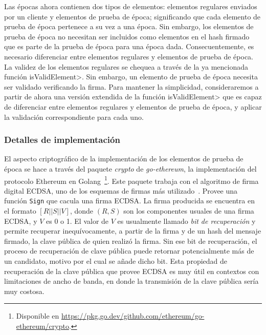 Las épocas ahora contienen dos tipos de elementos: elementos regulares enviados por
un cliente y elementos de prueba de época; significando que cada elemento de prueba de época
pertenece a su vez a una época. Sin embargo, los elementos de prueba de época no necesitan ser
incluidos como elementos en el hash firmado que es parte de la prueba de época para una época
dada.
%
Consecuentemente, es necesario diferenciar entre elementos regulares y elementos de prueba de época.
%
La validez de los elementos regulares se chequea a través de la ya mencionada función
\<isValidElement>.
%
Sin embargo, un elemento de prueba de época necesita ser validado verificando la firma.
%
Para mantener la simplicidad, consideraremos a partir de ahora una versión extendida de la función
\<isValidElement> que es capaz de diferenciar entre elementos regulares y elementos de prueba de época,
y aplicar la validación correspondiente para cada uno.

\subsubsection{Detalles de implementación}

El aspecto criptográfico de la implementación de los elementos de prueba de época se
hace a través del paquete \textit{crypto} de \textit{go-ethereum}, la implementación
del protocolo Ethereum en Golang~\footnote{Disponible en \url{https://pkg.go.dev/github.com/ethereum/go-ethereum/crypto}.}.
%
Este paquete trabaja con el algoritmo de firma digital ECDSA, uno de los esquemas de firmas más
utilizado~\cite{real.world.crypto}.
%
Provee una función \texttt{Sign} que cacula una firma ECDSA.
%
La firma producida se encuentra en el formato $[R || S || V]$, donde $(R, S)$ son los componentes usuales
de una firma ECDSA, y $V$ es 0 o 1.
%
El valor de $V$ es usualmente llamado \textit{bit de recuperación} y permite recuperar inequívocamente,
a partir de la firma y de un hash del mensaje firmado, la clave pública de quien realizó la firma.
%
Sin ese bit de recuperación, el proceso de recuperación de clave pública puede retornar potencialmente
más de un candidato, motivo por el cual se añade dicho bit.
% 
Esta propiedad de recuperación de la clave pública que provee ECDSA es muy útil en contextos con limitaciones
de ancho de banda, en donde la transmisión de la clave pública sería muy costosa.

